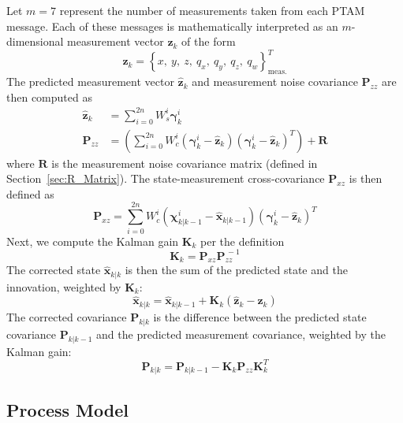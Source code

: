 Let $m = 7$ represent the number of measurements taken from each PTAM message. Each of these messages is mathematically interpreted as an $m$-dimensional measurement vector $\mathbf{z}_{k}$ of the form
%
\begin{equation}
\mathbf{z}_{k} = \left\lbrace x,\ y,\ z,\ q_{x},\ q_{y},\ q_{z},\ q_{w} \right\rbrace ^{T} _{\text{meas.}} 
\end{equation}
%
The predicted measurement vector $\hat{\mathbf{z}}_{k}$ and measurement noise covariance $\mathbf{P}_{zz}$ are then computed as
%
\begin{align}
\hat{\mathbf{z}}_{k} &= \sum^{2n}_{i=0} W^{i}_{s} \bm{\gamma}^{i}_{k} \label{eq:zHat} \\
\mathbf{P}_{zz} &= \left( \sum^{2n}_{i=0} W^{i}_{c} \left( \bm{\gamma}^{i}_{k} - \hat{\mathbf{z}}_{k} \right) \left( \bm{\gamma}^{i}_{k} - \hat{\mathbf{z}}_{k} \right)^{T} \right) + \mathbf{R} \label{eq:P_zz}
\end{align}
%
where $\mathbf{R}$ is the measurement noise covariance matrix (defined in Section~\ref{sec:R_Matrix}). The state-measurement cross-covariance $\mathbf{P}_{xz}$ is then defined as
%
\begin{equation} \label{eq:P_xz}
\mathbf{P}_{xz} = \sum^{2n}_{i=0} W^{i}_{c} \left( \bm{\chi}^{i}_{k | k-1} - \hat{\mathbf{x}}_{k | k-1} \right) \left( \bm{\gamma}^{i}_{k} - \hat{\mathbf{z}}_{k} \right)^{T}
\end{equation}
%
Next, we compute the Kalman gain $\mathbf{K}_{k}$ per the definition
%
\begin{equation}
\mathbf{K}_{k} = \mathbf{P}_{xz} \mathbf{P}^{\,-1}_{zz}
\end{equation}
%
The corrected state $\hat{\mathbf{x}}_{k | k}$ is then the sum of the predicted state and the innovation, weighted by $\mathbf{K}_{k}$:
%
\begin{equation}
\hat{\mathbf{x}}_{k | k} = \hat{\mathbf{x}}_{k | k-1} + \mathbf{K}_{k} \left( \hat{\mathbf{z}}_{k} - \mathbf{z}_{k} \right)
\end{equation}
%
The corrected covariance $\mathbf{P}_{k | k}$ is the difference between the predicted state covariance $\mathbf{P}_{k | k-1}$ and the predicted measurement covariance, weighted by the Kalman gain:
%
\begin{equation}
\mathbf{P}_{k | k} = \mathbf{P}_{k | k-1} - \mathbf{K}_{k} \mathbf{P}_{zz} \mathbf{K}_{k}^{T}
\end{equation}

\subsection{Process Model} \label{Process_Model}

